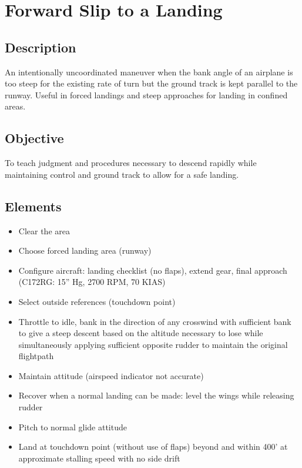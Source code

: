 \section{Forward Slip to a Landing}

\subsection{Description}

An intentionally uncoordinated maneuver when the bank angle of an airplane is
too steep for the existing rate of turn but the ground track is kept parallel
to the runway. Useful in forced landings and steep approaches for landing in
confined areas.

\subsection{Objective}

To teach judgment and procedures necessary to descend rapidly while maintaining
control and ground track to allow for a safe landing.

\subsection{Elements}

\begin{itemize}
  \item Clear the area
  \item Choose forced landing area (runway)
  \item Configure aircraft: landing checklist (no flaps), extend gear, final
    approach (C172RG: 15'' Hg, 2700 RPM, 70 KIAS)
  \item Select outside references (touchdown point)
  \item Throttle to idle, bank in the direction of any crosswind with
    sufficient bank to give a steep descent based on the altitude necessary to
    lose while simultaneously applying sufficient opposite rudder to maintain
    the original flightpath
  \item Maintain attitude (airspeed indicator not accurate)
  \item Recover when a normal landing can be made: level the wings while
    releasing rudder
  \item Pitch to normal glide attitude
  \item Land at touchdown point (without use of flaps) beyond and within 400’
    at approximate stalling speed with no side drift
\end{itemize}

